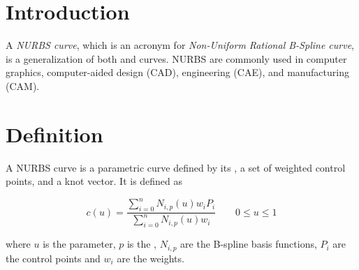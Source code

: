 \documentclass[12pt]{article}
\begin{document}
\section{Introduction}
A \emph{NURBS curve}, which is an acronym for \emph{Non-Uniform Rational B-Spline curve}, is a generalization of both  and  curves. NURBS are commonly used in computer graphics, computer-aided design (CAD), engineering (CAE), and manufacturing (CAM).

\section{Definition}
A NURBS curve is a parametric curve defined by its , a set of weighted control points, and a knot vector. It is defined as

\[
c(u) = \frac { \sum_{i=0}^{n} N_{i,p}(u) w_i P_i} {\sum_{i=0}^{n} N_{i,p}(u) w_i} \quad\quad 0 \leq u \leq 1
\]

where $u$ is the parameter, $p$ is the , $N_{i,p}$ are the B-spline basis functions, $P_i$ are the control points and $w_i$ are the weights.
\end{document}
